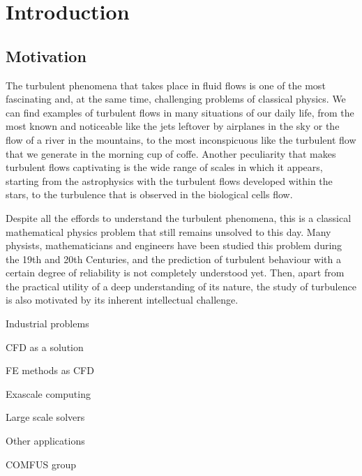 
\chapter{Introduction}
\label{chap-Introduction}

\section{Motivation}

The turbulent phenomena that takes place in fluid flows is one of the most fascinating and, at the same time, challenging problems of classical physics. We can find examples of turbulent flows in many situations of our daily life, from the most known and noticeable like the jets leftover by airplanes in the sky or the flow of a river in the mountains, to the most inconspicuous like the turbulent flow that we generate in the morning cup of coffe. Another peculiarity that makes turbulent flows captivating is the wide range of scales in which it appears, starting from the astrophysics with the turbulent flows developed within the stars, to the turbulence that is observed in the biological cells flow.

Despite all the effords to understand the turbulent phenomena, this is a classical mathematical physics problem that still remains unsolved to this day. Many physists, mathematicians and engineers have been studied this problem during the 19th and 20th Centuries, and the prediction of turbulent behaviour with a certain degree of reliability is not completely understood yet. Then, apart from the practical utility of a deep understanding of its nature, the study of turbulence is also motivated by its inherent intellectual challenge.

Industrial problems

CFD as a solution

FE methods as CFD

Exascale computing

Large scale solvers

Other applications 

COMFUS group


